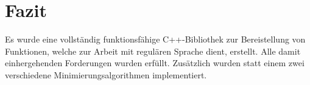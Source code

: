 \chapter{Fazit}

Es wurde eine vollständig funktionsfähige C++-Bibliothek zur Bereistellung von Funktionen, welche zur Arbeit mit regulären Sprache dient, erstellt. Alle damit einhergehenden Forderungen wurden erfüllt. Zusätzlich wurden statt einem zwei verschiedene Minimierungsalgorithmen implementiert.